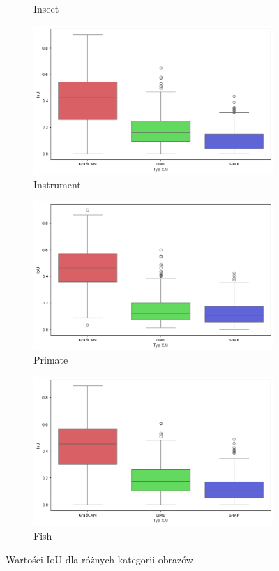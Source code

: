 \begin{figure}[h]
\begin{subfigure}[b]{0.3\textwidth}
		\caption{Insect}
	\end{subfigure}
	\begin{subfigure}[b]{0.3\textwidth}
		\centering\includegraphics[width=.9\textwidth]{img/base_iou_music}
		\caption{Instrument}
	\end{subfigure}
	\begin{subfigure}[b]{0.3\textwidth}
		\centering\includegraphics[width=.9\textwidth]{img/base_iou_primate}
		\caption{Primate}
	\end{subfigure}
	\begin{subfigure}[b]{0.3\textwidth}
		\centering\includegraphics[width=.9\textwidth]{img/base_iou_fish}
		\caption{Fish}
	\end{subfigure}
	\caption{Wartości IoU dla różnych kategorii obrazów}
	\label{rys:base_iou_category}
\end{figure}

